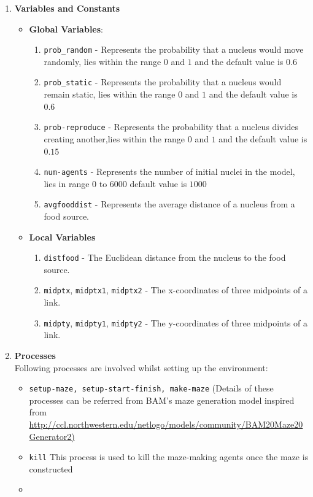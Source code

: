 \documentclass[a4paper, 11pt]{article}
\begin{document}
\begin{enumerate}
    \item \textbf{Variables and Constants} 
    \begin{itemize}
        \item \textbf{Global Variables}:
    \begin{enumerate}
        \item \texttt{prob\_random} - Represents the probability that a nucleus would move randomly, lies within the range $0$ and $1$ and the default value is $0.6$
        \item \texttt{prob\_static} - Represents the probability that a nucleus would remain static, lies within the range $0$ and $1$ and the default value is $0.6$
        \item \texttt{prob-reproduce} - Represents the probability that a nucleus divides creating another,lies within the range $0$ and $1$ and the default value is $0.15$
        \item \texttt{num-agents} - Represents the number of initial nuclei in the model, lies in range $0$ to $6000$ default value is $1000$
        \item \texttt{avgfooddist} - Represents the average distance of a nucleus from a food source.
    \end{enumerate}
    
    \item \textbf{Local Variables}
    \begin{enumerate}
        \item \texttt{distfood} - The Euclidean distance from the nucleus to the food source.
        \item \texttt{midptx}, \texttt{midptx1}, \texttt{midptx2} - The x-coordinates of three midpoints of a link. 
        \item \texttt{midpty}, \texttt{midpty1}, \texttt{midpty2} - The y-coordinates of three midpoints of a link. 
    \end{enumerate}
    \end{itemize}
    \item \textbf{Processes}\\
    Following processes are involved whilst setting up the environment:
    \begin{itemize}
        \item \texttt{setup-maze, setup-start-finish, make-maze} (Details of these processes can be referred from BAM's maze generation model inspired from \url{http://ccl.northwestern.edu/netlogo/models/community/BAM20Maze20Generator2)}
        \item \texttt{kill} This process is used to kill the maze-making agents once the maze is constructed
        \item \texttt{}
        


\end{itemize}
\end{enumerate}
\end{document}
